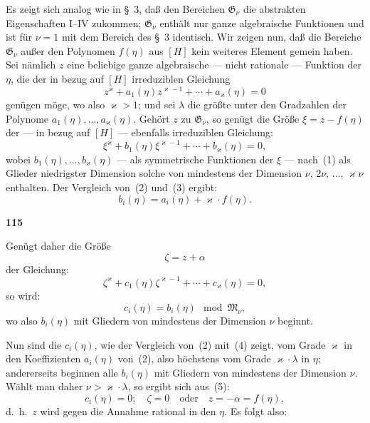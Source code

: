 \documentclass[12pt,a4paper]{article}
\begin{document}
Es zeigt sich analog wie in \S\ 3, da\ss{} den Bereichen $\mathfrak{G}_{\nu}$ die abstrakten Eigenschaften I--IV zukommen; $\mathfrak{G}_{\nu}$ enth\"alt nur ganze algebraische Funktionen und ist f\"ur $\nu = 1$ mit dem Bereich des \S\ 3 identisch. Wir zeigen nun, da\ss{} die Bereiche $\mathfrak{G}_{\nu}$ au\ss er den Polynomen $f(\eta)$ aus $[H]$ kein weiteres Element gemein haben. Sei n\"amlich $z$ eine beliebige ganze algebraische --- nicht rationale --- Funktion der $\eta$, die der in bezug auf $[H]$ irreduziblen Gleichung
\begin{equation}\tag{2}
z^{\varkappa} + a_1(\eta) z^{\varkappa-1} + \cdots + a_{\varkappa}(\eta) = 0
\end{equation}
gen\"ugen m\"oge, wo also $\varkappa > 1$; und sei $\lambda$ die gr\"o\ss te unter den Gradzahlen der Polynome $a_1(\eta), \ldots, a_{\varkappa}(\eta)$. Geh\"ort $z$ zu $\mathfrak{G}_{\nu}$, so gen\"ugt die Gr\"o\ss e $\xi = z - f(\eta)$ der --- in bezug auf $[H]$ --- ebenfalls irreduziblen Gleichung:
\begin{equation}\tag{3}
\xi^{\varkappa} + b_1(\eta) \xi^{\varkappa-1} + \cdots + b_{\varkappa}(\eta) = 0,
\end{equation}
wobei $b_1(\eta), \ldots, b_{\varkappa}(\eta)$ --- als symmetrische Funktionen der $\xi$ --- nach~(1) als Glieder niedrigster Dimension solche von mindestens der Dimension $\nu$, $2\nu$, $\ldots$, $\varkappa\nu$ enthalten. Der Vergleich von~(2) und~(3) ergibt:
\[b_i(\eta) = a_i(\eta) + \varkappa \cdot f(\eta).\]

\newpage
\begin{center}
\textbf{115}
\end{center}

Gen\"ugt daher die Gr\"o\ss e
\begin{equation}\tag{4}
\zeta = z + \alpha
\end{equation}
der Gleichung:
\begin{equation}\tag{5}
\zeta^{\varkappa} + c_1(\eta) \zeta^{\varkappa-1} + \cdots + c_{\varkappa}(\eta) = 0,
\end{equation}
so wird:
\[c_i(\eta) = b_i(\eta) \mod \mathfrak{M}_{\nu},\]
wo also $b_i(\eta)$ mit Gliedern von mindestens der Dimension $\nu$ beginnt.

Nun sind die $c_i(\eta)$, wie der Vergleich von~(2) mit~(4) zeigt, vom Grade $\varkappa$ in den Koeffizienten $a_i(\eta)$ von~(2), also h\"ochstens vom Grade $\varkappa \cdot \lambda$ in $\eta$; andererseits beginnen alle $b_i(\eta)$ mit Gliedern von mindestens der Dimension $\nu$. W\"ahlt man daher $\nu > \varkappa \cdot \lambda$, so ergibt sich aus~(5):
\[c_i(\eta) = 0; \quad \zeta = 0 \quad \text{oder} \quad z = -\alpha = f(\eta),\]
d.\ h.\ $z$ wird gegen die Annahme rational in den $\eta$. Es folgt also:
\end{document}
